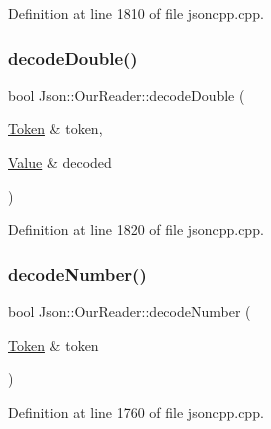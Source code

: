 Definition at line 1810 of file jsoncpp.\+cpp.

\hypertarget{class_json_1_1_our_reader_aa5c15a8cd32754f07430dedba3d1308e}{}\label{class_json_1_1_our_reader_aa5c15a8cd32754f07430dedba3d1308e} 
\subsubsection{\texorpdfstring{decode\+Double()}{decodeDouble()}\hspace{0.1cm}{\footnotesize\ttfamily [2/2]}}
{\footnotesize\ttfamily bool Json\+::\+Our\+Reader\+::decode\+Double (\begin{DoxyParamCaption}\item[{\hyperlink{class_json_1_1_our_reader_1_1_token}{Token} \&}]{token,  }\item[{\hyperlink{class_json_1_1_value}{Value} \&}]{decoded }\end{DoxyParamCaption})\hspace{0.3cm}{\ttfamily [private]}}



Definition at line 1820 of file jsoncpp.\+cpp.

\hypertarget{class_json_1_1_our_reader_a272d271290933a89abfd5096dd69c9e9}{}\label{class_json_1_1_our_reader_a272d271290933a89abfd5096dd69c9e9} 
\subsubsection{\texorpdfstring{decode\+Number()}{decodeNumber()}\hspace{0.1cm}{\footnotesize\ttfamily [1/2]}}
{\footnotesize\ttfamily bool Json\+::\+Our\+Reader\+::decode\+Number (\begin{DoxyParamCaption}\item[{\hyperlink{class_json_1_1_our_reader_1_1_token}{Token} \&}]{token }\end{DoxyParamCaption})\hspace{0.3cm}{\ttfamily [private]}}



Definition at line 1760 of file jsoncpp.\+cpp.

\hypertarget{class_json_1_1_our_reader_a712270d53a2f023c2f406ac813548340}{}\label{class_json_1_1_our_reader_a712270d53a2f023c2f406ac813548340} 
